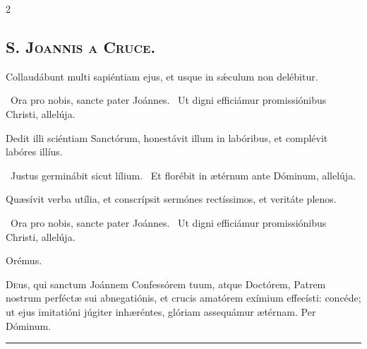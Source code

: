 \documentclass[9pt,twoside]{extarticle}
\begin{document}
\begin{multicols}{2}
\subsubsection*{\center {}}
\subsection*{\center \textsc{S. Joannis a Cruce.}}

\begin{tightlist}{}
\item {} 
\item {} Collaudábunt multi sapiéntiam ejus, et usque in sǽculum non delébitur.
\item {}~Ora pro nobis, sancte pater Joánnes. ~Ut digni efficiámur promissiónibus Christi, allelúja.
\item {} Dedit illi sciéntiam Sanctórum, honestávit illum in labóribus, et complévit labóres illíus.
\item {}~Justus germinábit sicut lílium. ~Et florébit in ætérnum ante Dóminum, allelúja.
\item {} Quæsívit verba utília, et conscrípsit sermónes rectíssimos, et veritáte plenos.
\item {}~Ora pro nobis, sancte pater Joánnes. ~Ut digni efficiámur promissiónibus Christi, allelúja.
\item Orémus. \hfill {}
\end{tightlist}
\lettrine{D}eus, qui sanctum Joánnem Confessórem tuum, atque Doctórem, Patrem nostrum perféctæ sui abnegatiónis, et crucis amatórem exímium effecísti: concéde; ut ejus imitatióni júgiter inhæréntes, glóriam assequámur ætérnam. Per Dóminum.

\begin{center}\textcolor{red}{\rule{\linewidth}{0.5pt}} \end{center}


\end{multicols}
\end{document}

